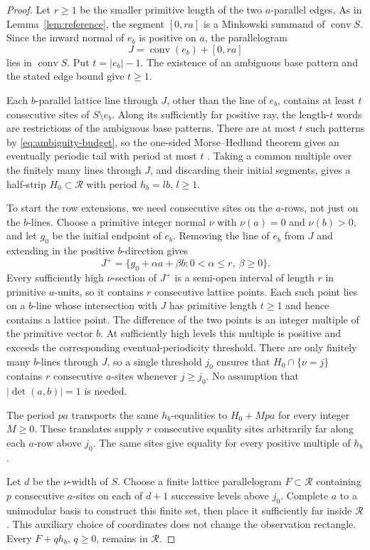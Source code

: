 \documentclass[11pt]{article}
\numberwithin{equation}{section}
\theoremstyle{definition}
\theoremstyle{remark}
\newcommand{\conv}{\operatorname{conv}}
\newcommand{\RR}{\mathcal R}
\begin{document}
\begin{proof}
Let $r\ge1$ be the smaller primitive length of the two $a$-parallel edges. As in
Lemma~\ref{lem:reference}, the segment $[0,ra]$ is a Minkowski summand of $\conv S$. Since the
inward normal of $e_b$ is positive on $a$, the parallelogram
\[
 J=\conv(e_b)+[0,ra]
\]
lies in $\conv S$. Put $t=|e_b|-1$. The existence of an ambiguous base pattern and the stated edge
bound give $t\ge1$.

Each $b$-parallel lattice line through $J$, other than the line of $e_b$, contains at least $t$
consecutive sites of $S\setminus e_b$. Along its sufficiently far positive ray, the length-$t$ words
are restrictions of the ambiguous base patterns. There are at most $t$ such patterns by
\eqref{eq:ambiguity-budget}, so the one-sided Morse--Hedlund theorem gives an eventually periodic
tail with period at most $t$ \cite[Theorem~2.2(ii)]{CK}. Taking a common multiple over the finitely many lines through $J$, and
discarding their initial segments, gives a half-strip $H_0\subset\RR$ with period $h_b=lb$, $l\ge1$.

To start the row extensions, we need consecutive sites on the $a$-rows, not just on the
$b$-lines. Choose a primitive integer normal $\nu$ with $\nu(a)=0$ and $\nu(b)>0$, and let $g_0$
be the initial endpoint of $e_b$. Removing the line of $e_b$ from $J$ and extending in the positive
$b$-direction gives
\[
 J^+=\{g_0+\alpha a+\beta b:0<\alpha\le r,\ \beta\ge0\}.
\]
Every sufficiently high $\nu$-section of $J^+$ is a semi-open interval of length $r$ in primitive
$a$-units, so it contains $r$ consecutive lattice points. Each such point lies on a $b$-line whose
intersection with $J$ has primitive length $t\ge1$ and hence contains a lattice point. The
difference of the two points is an integer multiple of the primitive vector $b$. At sufficiently
high levels this multiple is positive and exceeds the corresponding eventual-periodicity threshold.
There are only finitely many $b$-lines through $J$, so a single threshold $j_0$ ensures that
$H_0\cap\{\nu=j\}$ contains $r$ consecutive $a$-sites whenever $j\ge j_0$. No assumption that
$|\det(a,b)|=1$ is needed.

The period $pa$ transports the same $h_b$-equalities to $H_0+Mpa$ for every integer $M\ge0$. These
translates supply $r$ consecutive equality sites arbitrarily far along each $a$-row above $j_0$. The
same sites give equality for every positive multiple of $h_b$.

Let $d$ be the $\nu$-width of $S$. Choose a finite lattice parallelogram $F\subset\RR$ containing
$p$ consecutive $a$-sites on each of $d+1$ successive levels above $j_0$. Complete $a$ to a
unimodular basis to construct this finite set, then place it sufficiently far inside $\RR$. This
auxiliary choice of coordinates does not change the observation rectangle. Every $F+qh_b$, $q\ge0$,
remains in $\RR$.


\end{proof}
\end{document}
